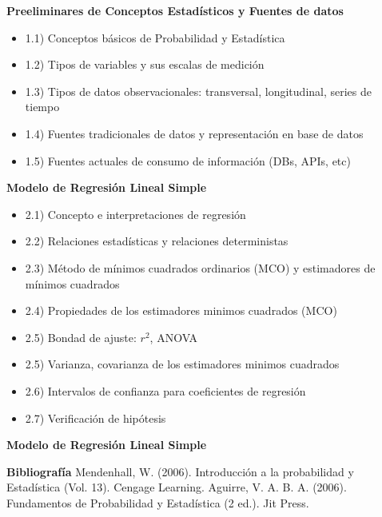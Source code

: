 \documentclass{../oxmathproblems}
\begin{document}
\begin{questions}

\miquestion \textbf{Preeliminares de Conceptos Estadísticos y Fuentes de datos}

\begin{itemize}

\item 1.1) Conceptos básicos de Probabilidad y Estadística

\item 1.2) Tipos de variables y sus escalas de medición 

\item 1.3) Tipos de datos observacionales: transversal, longitudinal, series de tiempo

\item 1.4) Fuentes tradicionales de datos y representación en base de datos

\item 1.5) Fuentes actuales de consumo de información (DBs, APIs, etc) 

\end{itemize}

\miquestion \textbf{Modelo de Regresión Lineal Simple}

\begin{itemize}

\item 2.1) Concepto e interpretaciones de regresión 
\item 2.2) Relaciones estadísticas y relaciones deterministas
\item 2.3) Método de mínimos cuadrados ordinarios (MCO) y estimadores de mínimos cuadrados
\item 2.4) Propiedades de los estimadores minimos cuadrados (MCO)
\item 2.5) Bondad de ajuste: $r^2$, ANOVA
\item 2.5) Varianza, covarianza de los estimadores minimos cuadrados
\item 2.6) Intervalos de confianza para coeficientes de regresión
\item 2.7) Verificación de hipótesis 

\end{itemize}

\miquestion \textbf{Modelo de Regresión Lineal Simple}


\end{questions}
\textbf{Bibliografía}
Mendenhall, W. (2006). Introducción a la probabilidad y Estadística (Vol. 13). Cengage Learning.
Aguirre, V. A. B. A. (2006). Fundamentos de Probabilidad y Estadística (2 ed.). Jit Press.
\end{document}
